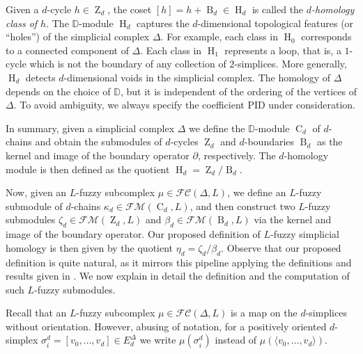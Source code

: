 \documentclass[a4paper,10pt]{article}
\newcommand{\bbd}{\mathbb{D}}
\newcommand{\calfm}{\mathcal{F\!M}}
\newcommand{\calfc}{\mathcal{FC}}
\DeclareMathOperator{\Co}{C}
\DeclareMathOperator{\Zo}{Z}
\DeclareMathOperator{\Bo}{B}
\DeclareMathOperator{\Ho}{H}
\begin{document}
Given a \(d\)-cycle \(h \in \Zo_d\), the coset \([h] = h + \Bo_d \in \Ho_d\) is called the \emph{\(d\)-homology class of \(h\)}. The \(\bbd\)-module \(\Ho_d\) captures the \(d\)-dimensional topological features (or ``holes'') of the simplicial complex \(\Delta\). For example, each class in \(\Ho_0\) corresponds to a connected component of \(\Delta\). Each class in \(\Ho_1\) represents a loop, that is, a \(1\)-cycle which is not the boundary of any collection of \(2\)-simplices. More generally, \(\Ho_d\) detects \(d\)-dimensional voids in the simplicial complex. The homology of \(\Delta\) depends on the choice of \(\mathbb{D}\), but it is independent of the ordering of the vertices of \(\Delta\). To avoid ambiguity, we always specify the coefficient PID under consideration. 

In summary, given a simplicial complex \(\Delta\) we define the \(\bbd\)-module \(\Co_d\) of \(d\)-chains and obtain the submodules of \(d\)-cycles \(\Zo_d\) and \(d\)-boundaries \(\Bo_d\) as the kernel and image of the boundary operator \(\partial\), respectively. The \(d\)-homology module is then defined as the quotient \(\Ho_d = \Zo_d / \Bo_d\). 

Now, given an \(L\)-fuzzy subcomplex \(\mu \in \calfc(\Delta,L)\), we define an \(L\)-fuzzy submodule of \(d\)-chains \(\kappa_d \in \calfm(\Co_d,L)\), and then construct two \(L\)-fuzzy submodules \(\zeta_d \in \calfm(\Zo_d,L)\) and \(\beta_d \in \calfm(\Bo_d,L)\) via the kernel and image of the boundary operator. Our proposed definition of
\(L\)-fuzzy simplicial homology is then given by the quotient \(\eta_d = \zeta_d / \beta_d\). 
Observe that our proposed definition is quite natural, as it mirrors this pipeline applying the definitions and results given in .
We now explain in detail the definition and the computation of such \(L\)-fuzzy submodules.

Recall that an \(L\)-fuzzy subcomplex \(\mu \in \calfc(\Delta,L)\) is a map on the \(d\)-simplices without orientation. However, abusing of notation, for a positively oriented \(d\)-simplex \(\sigma^{d}_{i} = [v_0,\ldots,v_d] \in E^{\Delta}_d\) we write \(\mu(\sigma^{d}_i)\) instead of \(\mu(\langle v_0,\ldots,v_d \rangle)\). 
\end{document}
